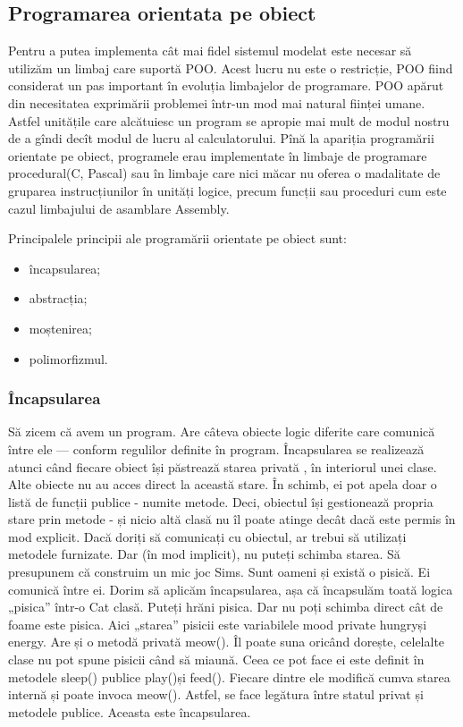 \subsection{Programarea orientata pe obiect}

Pentru a putea implementa cât mai fidel sistemul modelat
este necesar să utilizăm un limbaj care suportă POO.
Acest lucru nu este o restricție, POO fiind considerat un pas important în evoluția limbajelor de programare.
POO apărut din necesitatea exprimării problemei într-un mod mai natural
ființei umane. Astfel unitățile care alcătuiesc un program se apropie mai mult
de modul nostru de a gîndi decît modul de lucru al calculatorului. Pînă la
apariția programării orientate pe obiect, programele erau implementate în
limbaje de programare procedural(C, Pascal) sau în limbaje care nici măcar nu
oferea o madalitate de gruparea instrucțiunilor în unități logice, precum
funcții sau proceduri cum este cazul limbajului de asamblare Assembly.


Principalele principii ale programării orientate pe obiect sunt:
\begin{itemize}
    \item încapsularea;
    \item abstracția;
    \item moștenirea;
    \item polimorfizmul.
\end{itemize}


\subsubsection{ Încapsularea }
Să zicem că avem un program. Are câteva obiecte logic diferite care comunică
între ele — conform regulilor definite în program. Încapsularea se realizează
atunci când fiecare obiect își păstrează starea privată , în interiorul unei
clase. Alte obiecte nu au acces direct la această stare. În schimb, ei pot
apela doar o listă de funcții publice - numite metode. Deci, obiectul își
gestionează propria stare prin metode - și nicio altă clasă nu îl poate atinge
decât dacă este permis în mod explicit. Dacă doriți să comunicați cu obiectul,
ar trebui să utilizați metodele furnizate. Dar (în mod implicit), nu puteți
schimba starea. Să presupunem că construim un mic joc Sims. Sunt oameni și
există o pisică. Ei comunică între ei. Dorim să aplicăm încapsularea, așa că
încapsulăm toată logica „pisica” într-o Cat clasă.  Puteți hrăni pisica. Dar nu
poți schimba direct cât de foame este pisica. Aici „starea” pisicii este
variabilele mood private hungryși energy. Are și o metodă privată meow(). Îl
poate suna oricând dorește, celelalte clase nu pot spune pisicii când să
miaună. Ceea ce pot face ei este definit în metodele sleep() publice play()și
feed(). Fiecare dintre ele modifică cumva starea internă și poate invoca
meow(). Astfel, se face legătura între statul privat și metodele publice.
Aceasta este încapsularea.

